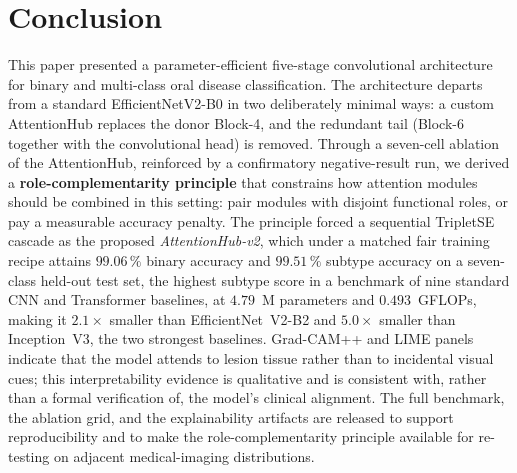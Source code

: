\section{Conclusion}\label{sec:conclusion}

This paper presented a parameter-efficient five-stage convolutional
architecture for binary and multi-class oral disease classification. The
architecture departs from a standard EfficientNetV2-B0 in two deliberately
minimal ways: a custom AttentionHub replaces the donor Block-4, and the
redundant tail (Block-6 together with the convolutional head) is removed.
Through a seven-cell ablation of the AttentionHub, reinforced by a confirmatory
negative-result run, we derived a \textbf{role-complementarity principle} that
constrains how attention modules should be combined in this setting: pair
modules with disjoint functional roles, or pay a measurable accuracy penalty.
The principle forced a sequential Triplet\arrowto{}SE cascade as the proposed
\emph{AttentionHub-v2}, which under a matched fair training recipe attains
$99.06\,\%$ binary accuracy and $99.51\,\%$ subtype accuracy on a seven-class
held-out test set, the highest subtype score in a benchmark of nine standard
CNN and Transformer baselines, at $4.79$~M parameters and $0.493$~GFLOPs,
making it $2.1\times$ smaller than EfficientNet~V2-B2 and $5.0\times$ smaller
than Inception~V3, the two strongest baselines. Grad-CAM++ and LIME panels
indicate that the model attends to lesion tissue rather than to incidental
visual cues; this interpretability evidence is qualitative and is consistent
with, rather than a formal verification of, the model's clinical alignment. The
full benchmark, the ablation grid, and the explainability artifacts are released
to support reproducibility and to make the role-complementarity principle
available for re-testing on adjacent medical-imaging distributions.
